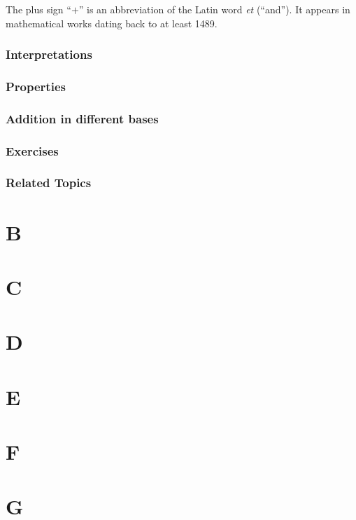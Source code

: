 \documentclass[a4paper]{book}
\begin{document}
The plus sign ``$+$'' is an abbreviation of the Latin word \textit{et} (``and''). It appears in mathematical
works dating back to at least 1489.

\subsection{Interpretations}

\subsection{Properties}

\subsection{Addition in different bases}

\subsection{Exercises}

\subsection{Related Topics}


\chapter{B}

\chapter{C}

\chapter{D}

\chapter{E}

\chapter{F}

\chapter{G}
\end{document}

